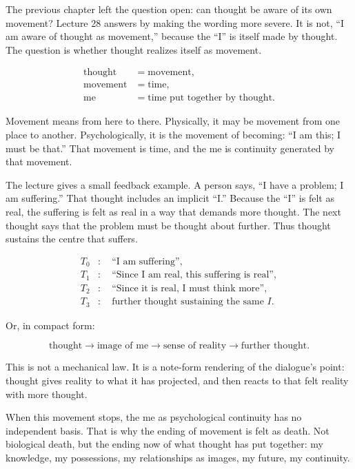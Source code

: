 \documentclass[11pt,oneside]{book}
\begin{document}
The previous chapter left the question open: can thought be aware of its own movement? Lecture 28 answers by making the wording more severe. It is not, ``I am aware of thought as movement,'' because the ``I'' is itself made by thought. The question is whether thought realizes itself as movement.

\begin{align}
\text{thought} &= \text{movement},\\
\text{movement} &= \text{time},\\
\text{me} &= \text{time put together by thought}.
\end{align}

Movement means from here to there. Physically, it may be movement from one place to another. Psychologically, it is the movement of becoming: ``I am this; I must be that.'' That movement is time, and the me is continuity generated by that movement.

The lecture gives a small feedback example. A person says, ``I have a problem; I am suffering.'' That thought includes an implicit ``I.'' Because the ``I'' is felt as real, the suffering is felt as real in a way that demands more thought. The next thought says that the problem must be thought about further. Thus thought sustains the centre that suffers.

\begin{align}
T_0 &: \quad \text{``I am suffering''},\\
T_1 &: \quad \text{``Since I am real, this suffering is real''},\\
T_2 &: \quad \text{``Since it is real, I must think more''},\\
T_3 &: \quad \text{further thought sustaining the same } I.
\end{align}

Or, in compact form:

\begin{equation}
\text{thought}
\longrightarrow
\text{image of me}
\longrightarrow
\text{sense of reality}
\longrightarrow
\text{further thought}.
\end{equation}

This is not a mechanical law. It is a note-form rendering of the dialogue's point: thought gives reality to what it has projected, and then reacts to that felt reality with more thought.

When this movement stops, the me as psychological continuity has no independent basis. That is why the ending of movement is felt as death. Not biological death, but the ending now of what thought has put together: my knowledge, my possessions, my relationships as images, my future, my continuity.
\end{document}
